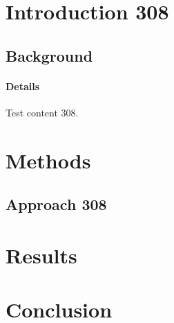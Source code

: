 \documentclass{article}
\begin{document}
\section{Introduction 308}
\subsection{Background}
\paragraph{Details} Test content 308.
\section{Methods}
\subsection{Approach 308}
\section{Results}
\section{Conclusion}
\end{document}
